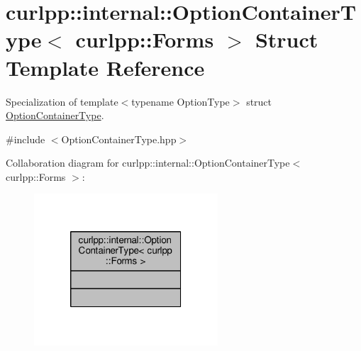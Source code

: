 \hypertarget{structcurlpp_1_1internal_1_1OptionContainerType_3_01curlpp_1_1Forms_01_4}{\section{curlpp\-:\-:internal\-:\-:Option\-Container\-Type$<$ curlpp\-:\-:Forms $>$ Struct Template Reference}
\label{structcurlpp_1_1internal_1_1OptionContainerType_3_01curlpp_1_1Forms_01_4}
}


Specialization of template$<$typename Option\-Type$>$ struct \hyperlink{structcurlpp_1_1internal_1_1OptionContainerType}{Option\-Container\-Type}.  




{\ttfamily \#include $<$Option\-Container\-Type.\-hpp$>$}



Collaboration diagram for curlpp\-:\-:internal\-:\-:Option\-Container\-Type$<$ curlpp\-:\-:Forms $>$\-:\nopagebreak
\begin{figure}[H]
\begin{center}
\leavevmode
\includegraphics[width=194pt]{structcurlpp_1_1internal_1_1OptionContainerType_3_01curlpp_1_1Forms_01_4__coll__graph}
\end{center}
\end{figure}
